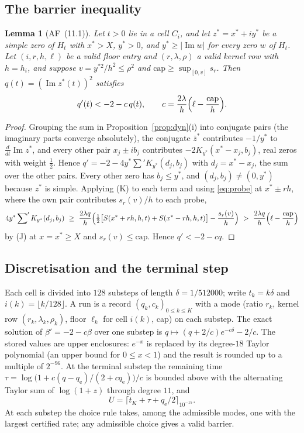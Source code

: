 \documentclass[11pt]{article}
\newtheorem{lemma}[theorem]{Lemma}
\theoremstyle{definition}
\newcommand{\capo}{\mathrm{cap}}
\newcommand{\qe}{q_{\mathrm e}}
\DeclareMathOperator{\Ima}{Im}
\begin{document}
\subsection{The barrier inequality}

\begin{lemma}[{AF~(11.1)}]\label{lem:raymond}
Let $t>0$ lie in a cell $C_i$, and let $z^*=x^*+iy^*$ be a simple zero of $H_t$ with
$x^*>X$, $y^*>0$, and $y^*\ge|\Ima w|$ for every zero $w$ of $H_t$. Let $(i,r,h,\ell)$ be a
valid floor entry and $(r,\lambda,\rho)$ a valid kernel row with $h=h_i$, and suppose
$v=y^{*2}/h^2\le\rho^2$ and $\capo\ge\sup_{[0,v]}s_r$. Then $q(t)=(\Ima z^*(t))^2$
satisfies
\[
q'(t)<-2-c\,q(t),\qquad c=\frac{2\lambda}h\Bigl(\ell-\frac{\capo}h\Bigr).
\]
\end{lemma}

\begin{proof}
Grouping the sum in Proposition~\ref{prop:dyn}(i) into conjugate pairs (the imaginary
parts converge absolutely), the conjugate $\bar z^*$ contributes $-1/y^*$ to
$\frac{d}{dt}\Ima z^*$, and every other pair $x_j\pm ib_j$ contributes
$-2K_{y^*}(x^*-x_j,b_j)$, real zeros with weight $\frac12$. Hence
$q'=-2-4y^*\sum'K_{y^*}(d_j,b_j)$ with $d_j=x^*-x_j$, the sum over the other pairs. Every
other zero has $b_j\le y^*$, and $(d_j,b_j)\ne(0,y^*)$ because $z^*$ is simple. Applying (K)
to each term and using \eqref{eq:probe} at $x^*\pm rh$, where the own pair contributes
$s_r(v)/h$ to each probe,
\[
4y^*\sideset{}{'}\sum K_{y^*}(d_j,b_j)\ \ge\ \frac{2\lambda q}h\Bigl(\tfrac12\bigl[S(x^*+rh,h,t)+S(x^*-rh,h,t)\bigr]-\frac{s_r(v)}h\Bigr)
\ >\ \frac{2\lambda q}h\Bigl(\ell-\frac{\capo}h\Bigr)
\]
by (J) at $x=x^*\ge X$ and $s_r(v)\le\capo$. Hence $q'<-2-cq$.
\end{proof}

\subsection{Discretisation and the terminal step}

Each cell is divided into $128$ substeps of length $\delta=1/512000$; write $t_k=k\delta$
and $i(k)=\lfloor k/128\rfloor$. A run is a record $(q_k,c_k)_{0\le k\le K}$ with a mode
(ratio $r_k$, kernel row $(r_k,\lambda_k,\rho_k)$, floor $\ell_k$ for cell $i(k)$, cap) on
each substep. The exact solution of $\beta'=-2-c\beta$ over one substep is
$q\mapsto(q+2/c)e^{-c\delta}-2/c$. The stored values are upper enclosures: $e^{-x}$ is
replaced by its degree-$18$ Taylor polynomial (an upper bound for $0\le x<1$) and the
result is rounded up to a multiple of $2^{-96}$. At the terminal substep the remaining
time $\tau=\log\bigl(1+c(q-\qe)/(2+c\qe)\bigr)/c$ is bounded above with the alternating
Taylor sum of $\log(1+z)$ through degree $11$, and
\[
U=\bigl\lceil t_K+\tau+\qe/2\bigr\rceil_{10^{-15}} .
\]
At each substep the choice rule takes, among the admissible modes, one with the largest
certified rate; any admissible choice gives a valid barrier.
\end{document}
